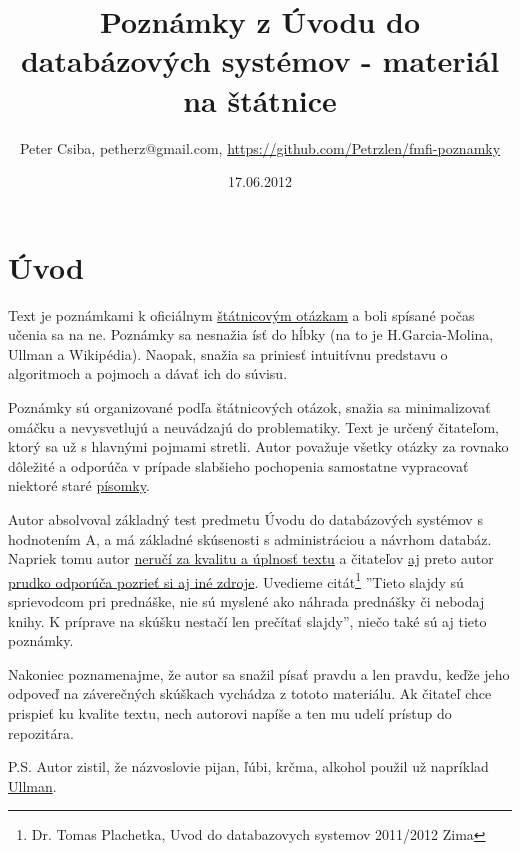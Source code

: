 \documentclass[10pt,a4paper]{article}
\title{Poznámky z Úvodu do databázových systémov - materiál na štátnice}
\date{17.06.2012}
\author{Peter Csiba, petherz@gmail.com, \url{https://github.com/Petrzlen/fmfi-poznamky}}
\begin{document}
\maketitle
\tableofcontents

\clearpage

\section*{Úvod}   

Text je poznámkami k oficiálnym \href{http://new.dcs.fmph.uniba.sk/index.php/Studium/Bakalarske/StatneSkusky}{štátnicovým otázkam} a boli spísané počas učenia sa na ne.
Poznámky sa nesnažia ísť do hĺbky (na to je H.Garcia-Molina, Ullman a Wikipédia).
Naopak, snažia sa priniesť intuitívnu predstavu o algoritmoch a pojmoch a dávať ich do súvisu.

Poznámky sú organizované podľa štátnicových otázok, snažia sa minimalizovať omáčku a nevysvetlujú a neuvádzajú do problematiky. Text je určený čitateľom, ktorý sa už s hlavnými pojmami stretli.
Autor považuje všetky otázky za rovnako dôležité a odporúča v prípade slabšieho pochopenia samostatne vypracovať niektoré staré \href{http://www.dcs.fmph.uniba.sk/~plachetk/TEACHING/DB2011/index.html}{písomky}.

Autor absolvoval základný test predmetu Úvodu do databázových systémov s hodnotením A, a má základné skúsenosti s administráciou a návrhom databáz. Napriek tomu autor \underline{neručí za kvalitu a úplnosť textu} a čitateľov \underline{aj} preto autor \underline{prudko odporúča pozrieť si aj iné zdroje}. Uvedieme citát\footnote{Dr. Tomas Plachetka, Uvod do databazovych systemov 2011/2012 Zima} ''Tieto slajdy sú sprievodcom pri prednáške, nie sú myslené ako náhrada
prednášky či nebodaj knihy. K príprave na skúšku nestačí len prečítať slajdy'', niečo také sú aj tieto poznámky.  

Nakoniec poznamenajme, že autor sa snažil písať pravdu a len pravdu, keďže jeho odpoveď na záverečných skúškach vychádza z tototo materiálu.
Ak čitateľ chce prispieť ku kvalite textu, nech autorovi napíše a ten mu udelí prístup do repozitára.

P.S. Autor zistil, že názvoslovie pijan, ľúbi, krčma, alkohol použil už napríklad \href{http://csip.sk/uploads/ullman.pdf}{Ullman}.

\end{document}
